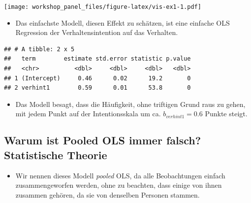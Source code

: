 \documentclass[
]{book}
\newenvironment{Shaded}{\begin{snugshade}}{\end{snugshade}}
\newcommand{\DataTypeTok}[1]{\textcolor[rgb]{0.13,0.29,0.53}{#1}}
\newcommand{\DecValTok}[1]{\textcolor[rgb]{0.00,0.00,0.81}{#1}}
\newcommand{\KeywordTok}[1]{\textcolor[rgb]{0.13,0.29,0.53}{\textbf{#1}}}
\newcommand{\NormalTok}[1]{#1}
\newcommand{\OperatorTok}[1]{\textcolor[rgb]{0.81,0.36,0.00}{\textbf{#1}}}
\newcommand{\StringTok}[1]{\textcolor[rgb]{0.31,0.60,0.02}{#1}}
\providecommand{\tightlist}{%
  \setlength{\itemsep}{0pt}\setlength{\parskip}{0pt}}
\begin{document}
\texttt{[image: workshop\_panel\_files/figure-latex/vis-ex1-1.pdf]}

\begin{itemize}
\tightlist
\item
  Das einfachste Modell, diesen Effekt zu schätzen, ist eine einfache OLS Regression der Verhaltensintention auf das Verhalten.
\end{itemize}

\begin{Shaded}
\end{Shaded}

\begin{verbatim}
## # A tibble: 2 x 5
##   term        estimate std.error statistic p.value
##   <chr>          <dbl>     <dbl>     <dbl>   <dbl>
## 1 (Intercept)     0.46      0.02      19.2       0
## 2 verhint1        0.59      0.01      53.8       0
\end{verbatim}

\begin{itemize}
\tightlist
\item
  Das Modell besagt, dass die Häufigkeit, ohne triftigen Grund raus zu gehen, mit jedem Punkt auf der Intentionsskala um ca. \(b_{verhint1} = 0.6\) Punkte steigt.
\end{itemize}

\hypertarget{warum-ist-pooled-ols-immer-falsch-statistische-theorie}{%
\subsection*{Warum ist Pooled OLS immer falsch? Statistische Theorie}\label{warum-ist-pooled-ols-immer-falsch-statistische-theorie}}

\begin{itemize}
\tightlist
\item
  Wir nennen dieses Modell \emph{pooled} OLS, da alle Beobachtungen einfach zusammengeworfen werden, ohne zu beachten, dass einige von ihnen zusammen gehören, da sie von denselben Personen stammen.
\end{itemize}
\end{document}
